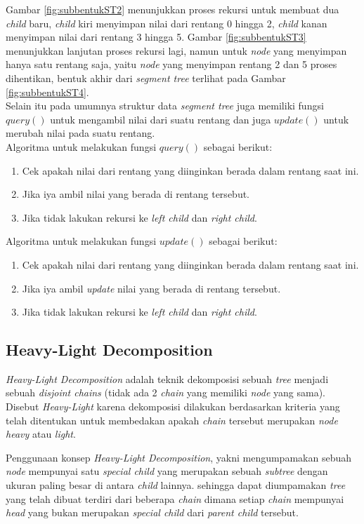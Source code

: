 \documentclass[a4paper]{IEEEtran}
\begin{document}
Gambar \ref{fig:subbentukST2} menunjukkan proses rekursi untuk membuat dua \textit{child} baru, \textit{child} kiri menyimpan nilai dari rentang 0 hingga 2, \textit{child} kanan menyimpan nilai dari rentang 3 hingga 5. Gambar \ref{fig:subbentukST3} menunjukkan lanjutan proses rekursi lagi, namun untuk \textit{node} yang menyimpan hanya satu rentang saja, yaitu \textit{node} yang menyimpan rentang 2 dan 5 proses dihentikan, bentuk akhir dari \textit{segment tree} terlihat pada Gambar \ref{fig:subbentukST4}.\\
Selain itu pada umumnya struktur data \textit{segment tree} juga memiliki fungsi \textit{$query()$} untuk mengambil nilai dari suatu rentang dan juga \textit{$update()$} untuk merubah nilai pada suatu rentang.\\
Algoritma untuk melakukan fungsi \textit{$query()$} sebagai berikut:
\begin{enumerate}
	\item Cek apakah nilai dari rentang yang diinginkan berada dalam rentang saat ini.
	\item Jika iya ambil nilai yang berada di rentang tersebut.
	\item Jika tidak lakukan rekursi ke \textit{left child} dan \textit{right child}.
\end{enumerate}
Algoritma untuk melakukan fungsi \textit{$update()$} sebagai berikut:
\begin{enumerate}
	\item Cek apakah nilai dari rentang yang diinginkan berada dalam rentang saat ini.
	\item Jika iya ambil \textit{update} nilai yang berada di rentang tersebut.
	\item Jika tidak lakukan rekursi ke \textit{left child} dan \textit{right child}.
\end{enumerate}
\subsection{Heavy-Light Decomposition}
\textit{Heavy-Light Decomposition} adalah teknik dekomposisi sebuah \textit{tree} menjadi sebuah \textit{disjoint chains} (tidak ada 2 \textit{chain} yang memiliki \textit{node} yang sama). Disebut \textit{Heavy-Light} karena dekomposisi dilakukan berdasarkan kriteria yang telah ditentukan untuk membedakan apakah \textit{chain} tersebut merupakan \textit{node heavy} atau \textit{light}.

\quad Penggunaan konsep \textit{Heavy-Light Decomposition}, yakni mengumpamakan sebuah \textit{node} mempunyai satu \textit{special child} yang merupakan sebuah \textit{subtree} dengan ukuran paling besar di antara \textit{child} lainnya. sehingga dapat diumpamakan \textit{tree} yang telah dibuat terdiri dari beberapa \textit{chain} dimana setiap \textit{chain} mempunyai \textit{head} yang bukan merupakan \textit{special child} dari \textit{parent child} tersebut.
\end{document}
